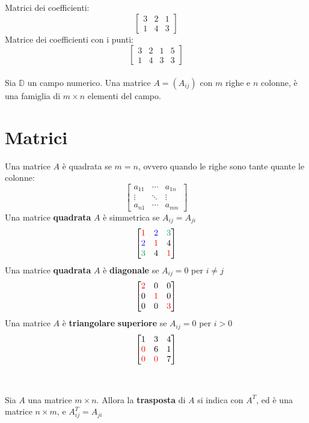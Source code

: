 \documentclass[italian]{article}
\begin{document}
Matrici dei coefficienti:
\[
	\begin{bmatrix}
		3 & 2 & 1 \\
		1 & 4 & 3
	\end{bmatrix}
\]
Matrice dei coefficienti con i punti:
\[
	\begin{bmatrix}
		3 & 2 & 1 & 5\\
		1 & 4 & 3 & 3
	\end{bmatrix}
\]\\
Sia $\mathbb{D}$ un campo numerico. Una matrice $A=(A_{ij})$ con $m$ righe e $n$ colonne, è una famiglia di $m\times n$ elementi del campo.
\pagebreak
\section{Matrici}
Una matrice $A$ è quadrata se $m=n$, ovvero quando le righe sono tante quante le colonne:
\[
\begin{bmatrix} 
	a_{11} & \cdots & a_{1n} \\
	\vdots & \ddots & \vdots \\
	 a_{n1} & \cdots & a_{mn}
\end{bmatrix}
\]
Una matrice \textbf{quadrata} $A$ è simmetrica se $A_{ij} = A_{ji}$
\[
	\begin{bmatrix} 
		\textcolor{red}{1} & \textcolor{blue}{2} & \textcolor{ForestGreen}{3} \\
		\textcolor{blue}{2} & \textcolor{red}{1} & 4 \\
		\textcolor{ForestGreen}{3} & 4 & \textcolor{red}{1}
	\end{bmatrix}
\]
Una matrice \textbf{quadrata} $A$ è \textbf{diagonale} se $A_{ij} = 0$ per $i\neq j$
\[
	\begin{bmatrix} 
		\textcolor{red}{2} & 0 & 0 \\
		0 & \textcolor{red}{1} & 0 \\
		0 & 0 & \textcolor{red}{3}
	\end{bmatrix}
\]
Una matrice $A$ è \textbf{triangolare} \textbf{superiore} se $A_{ij} = 0$ per $i > 0$
\[
	\begin{bmatrix} 
		1 & 3 & 4 \\
		\textcolor{red}{0} & 6 & 1 \\
		\textcolor{red}{0} & \textcolor{red}{0} & 7
	\end{bmatrix}
\]\\\\
Sia $A$ una matrice $m\times n$. Allora la \textbf{trasposta} di $A$ si indica con $A^T$, ed è una matrice $n\times m$, e $A^T_{ij} = A_{ji}$
\end{document}
